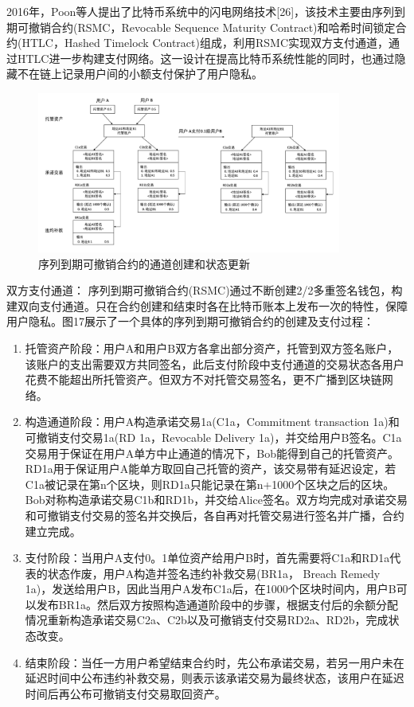 2016年，Poon等人提出了比特币系统中的闪电网络技术[26]，该技术主要由序列到期可撤销合约(RSMC，Revocable Sequence Maturity Contract)和哈希时间锁定合约(HTLC，Hashed Timelock Contract)组成，利用RSMC实现双方支付通道，通过HTLC进一步构建支付网络。这一设计在提高比特币系统性能的同时，也通过隐藏不在链上记录用户间的小额支付保护了用户隐私。

\begin{figure}
\centering
\includegraphics[width=10cm]{figures/lightning-network.png}
\caption{序列到期可撤销合约的通道创建和状态更新}
\label{fig:lightning-network}
\end{figure}

双方支付通道： 序列到期可撤销合约(RSMC)通过不断创建2/2多重签名钱包，构建双向支付通道。只在合约创建和结束时各在比特币账本上发布一次的特性，保障用户隐私。图17展示了一个具体的序列到期可撤销合约的创建及支付过程：

\begin{enumerate}
	\item 托管资产阶段：用户A和用户B双方各拿出部分资产，托管到双方签名账户，该账户的支出需要双方共同签名，此后支付阶段中支付通道的交易状态各用户花费不能超出所托管资产。但双方不对托管交易签名，更不广播到区块链网络。
	\item 构造通道阶段：用户A构造承诺交易1a(C1a，Commitment transaction 1a)和可撤销支付交易1a(RD 1a，Revocable Delivery 1a)，并交给用户B签名。C1a交易用于保证在用户A单方中止通道的情况下，Bob能得到自己的托管资产。RD1a用于保证用户A能单方取回自己托管的资产，该交易带有延迟设定，若C1a被记录在第n个区块，则RD1a只能记录在第n+1000个区块之后的区块。Bob对称构造承诺交易C1b和RD1b，并交给Alice签名。双方均完成对承诺交易和可撤销支付交易的签名并交换后，各自再对托管交易进行签名并广播，合约建立完成。
	\item 支付阶段：当用户A支付0。1单位资产给用户B时，首先需要将C1a和RD1a代表的状态作废，用户A构造并签名违约补救交易(BR1a， Breach Remedy 1a)，发送给用户B，因此当用户A发布C1a后，在1000个区块时间内，用户B可以发布BR1a。然后双方按照构造通道阶段中的步骤，根据支付后的余额分配情况重新构造承诺交易C2a、C2b以及可撤销支付交易RD2a、RD2b，完成状态改变。
	\item 结束阶段：当任一方用户希望结束合约时，先公布承诺交易，若另一用户未在延迟时间中公布违约补救交易，则表示该承诺交易为最终状态，该用户在延迟时间后再公布可撤销支付交易取回资产。
\end{enumerate}

